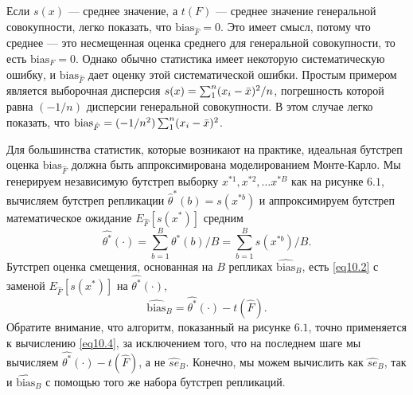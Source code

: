Если $s(x)$ --- среднее значение, а $t(F)$ --- среднее значение генеральной совокупности, легко показать, что $\text{bias}_{\hat{F}} = 0$. Это имеет смысл, потому что среднее --- это несмещенная оценка среднего для генеральной совокупности, то есть $\text{bias}_{F} = 0$. Однако обычно статистика имеет некоторую систематическую ошибку, и $\text{bias}_{\hat{F}}$ дает оценку этой систематической ошибки. Простым примером является выборочная дисперсия $s(x) = \sum_{1}^n(x_{i} - \Bar{x})^{2}/n$, погрешность которой равна $(-1/n)$ дисперсии генеральной совокупности. В этом случае легко показать, что $\text{bias}_{\hat{F}} = (-1/n^{2})\sum_{1}^n(x_{i} - \Bar{x})^{2}$.

Для большинства статистик, которые возникают на практике, идеальная бутстреп оценка $\text{bias}_{\hat{F}}$ должна быть аппроксимирована моделированием Монте-Карло. Мы генерируем независимую бутстреп выборку $x^{*1}, x^{*2}, \dots x^{*B}$ как на рисунке $6.1$, вычисляем бутстреп репликации $\hat{\theta}^{*}(b) = s(x^{*b})$ и аппроксимируем бутстреп математическое ожидание $E_{\hat{F}}[s(x^{*})]$ средним
\begin{equation}\label{eq10.3} 
    \hat{\theta^{*}}(\cdot) = \sum\limits_{b=1}^{B}\hat{\theta^{*}}(b)/B = \sum\limits_{b=1}^{B} s(x^{*b})/B.
\end{equation}
Бутстреп оценка смещения, основанная на $B$ репликах $\widehat{\text{bias}}_{B}$, есть \ref{eq10.2} с заменой $E_{\hat{F}}[s(x^{*})]$ на $\hat{\theta^{*}}(\cdot)$,
\begin{equation}\label{eq10.4} 
   \widehat{\text{bias}}_{B} = \hat{\theta^{*}}(\cdot) - t(\hat{F}).
\end{equation}
Обратите внимание, что алгоритм, показанный на рисунке $6.1$, точно применяется к вычислению \ref{eq10.4}, за исключением того, что на последнем шаге мы вычисляем $\hat{\theta^{*}}(\cdot) - t(\hat{F})$, а не $\widehat{se}_{B}$. Конечно, мы можем вычислить как $\widehat{se}_{B}$, так и $\widehat{\text{bias}}_{B}$ с помощью того же набора бутстреп репликаций.